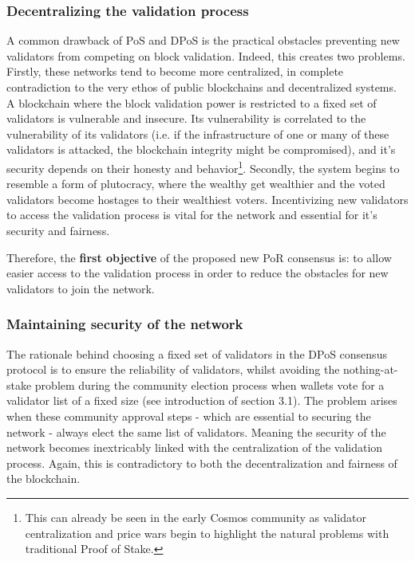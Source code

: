 \subsubsection{Decentralizing the validation process}
\label{sec:kiblockchaindecentral}
A common drawback of PoS and DPoS is the practical obstacles preventing new validators from competing on block validation. Indeed, this creates two problems. Firstly, these networks tend to become more centralized, in complete contradiction to the very ethos of public blockchains and decentralized systems. A blockchain where the block validation power is restricted to a fixed set of validators is vulnerable and insecure. Its vulnerability is correlated to the vulnerability of its validators (i.e. if the infrastructure of one or many of these validators is attacked, the blockchain integrity might be compromised), and it's security depends on their honesty and behavior\footnote{This can already be seen in the early Cosmos community as validator centralization and price wars begin to highlight the natural problems with traditional Proof of Stake. }. Secondly, the system begins to resemble a form of plutocracy, where the wealthy get wealthier and the voted validators become hostages to their wealthiest voters. Incentivizing new validators to access the validation process is vital for the network and essential for it's security and fairness.

Therefore, the \textbf{first objective} of the proposed new PoR consensus is: to allow easier access to the validation process in order to reduce the obstacles for new validators to join the network.

\subsubsection{Maintaining security of the network}
\label{sec:kiblockchaintradeoff}
The rationale behind choosing a fixed set of validators in the DPoS consensus protocol is to ensure the reliability of validators, whilst avoiding the nothing-at-stake problem during the community election process when wallets vote for a validator list of a fixed size (see introduction of section 3.1).  The problem arises when these community approval steps - which are essential to securing the network - always elect the same list of validators. Meaning the security of the network becomes inextricably linked with the centralization of the validation process. Again, this is contradictory to both the decentralization and fairness of the blockchain.

